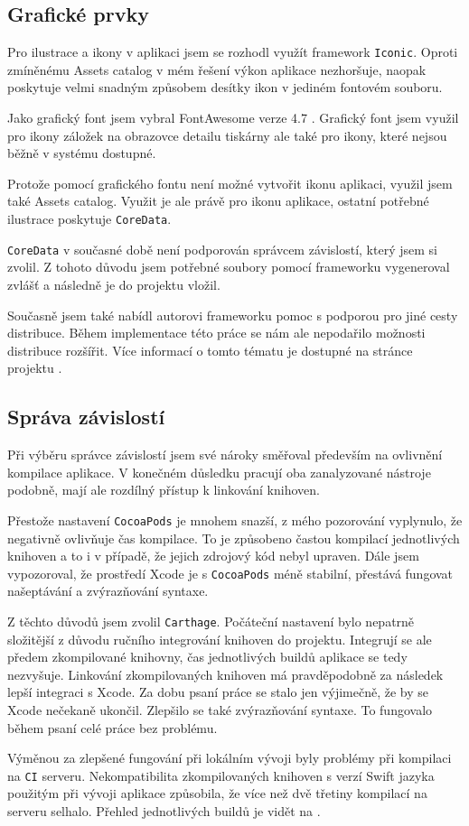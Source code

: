 \subsection{Grafické prvky}

Pro ilustrace a ikony v aplikaci jsem se rozhodl využít framework \texttt{Iconic}.
Oproti zmíněnému Assets catalog v mém řešení výkon aplikace nezhoršuje, naopak poskytuje velmi snadným způsobem desítky ikon v jediném fontovém souboru.

Jako grafický font jsem vybral FontAwesome verze 4.7 \cite{fontawesome-web}.
Grafický font jsem využil pro ikony záložek na obrazovce detailu tiskárny ale také pro ikony, které nejsou běžně v systému dostupné.

Protože pomocí grafického fontu není možné vytvořit ikonu aplikaci, využil jsem také Assets catalog.
Využit je ale právě pro ikonu aplikace, ostatní potřebné ilustrace poskytuje \texttt{CoreData}.

\texttt{CoreData} v současné době není podporován správcem závislostí, který jsem si zvolil.
Z tohoto důvodu jsem potřebné soubory pomocí frameworku vygeneroval zvlášť a následně je do projektu vložil.

Současně jsem také nabídl autorovi frameworku pomoc s podporou pro jiné cesty distribuce.
Během implementace této práce se nám ale nepodařilo možnosti distribuce rozšířit.
Více informací o tomto tématu je dostupné na stránce projektu \cite{github-iconic-brew}.

\subsection{Správa závislostí}

Při výběru správce závislostí jsem své nároky směřoval především na ovlivnění kompilace aplikace.
V konečném důsledku pracují oba zanalyzované nástroje podobně, mají ale rozdílný přístup k linkování knihoven.

Přestože nastavení \texttt{CocoaPods} je mnohem snazší, z mého pozorování vyplynulo, že negativně ovlivňuje čas kompilace.
To je způsobeno častou kompilací jednotlivých knihoven a to i v případě, že jejich zdrojový kód nebyl upraven.
Dále jsem vypozoroval, že prostředí Xcode je s \texttt{CocoaPods} méně stabilní, přestává fungovat našeptávání a zvýrazňování syntaxe.

Z těchto důvodů jsem zvolil \texttt{Carthage}.
Počáteční nastavení bylo nepatrně složitější z důvodu ručního integrování knihoven do projektu.
Integrují se ale předem zkompilované knihovny, čas jednotlivých buildů aplikace se tedy nezvyšuje.
Linkování zkompilovaných knihoven má pravděpodobně za následek lepší integraci s Xcode.
Za dobu psaní práce se stalo jen výjimečně, že by se Xcode nečekaně ukončil.
Zlepšilo se také zvýrazňování syntaxe.
To fungovalo během psaní celé práce bez problému.

Výměnou za zlepšené fungování při lokálním vývoji byly problémy při kompilaci na \texttt{CI} serveru.
Nekompatibilita zkompilovaných knihoven s verzí Swift jazyka použitým při vývoji aplikace způsobila, že více než dvě třetiny kompilací na serveru selhalo.
Přehled jednotlivých buildů je vidět na \cite{travis-octophone-builds}.
